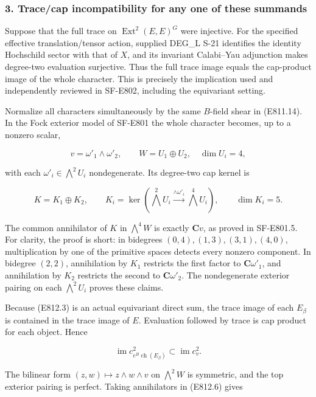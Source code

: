 \subsubsection{3. Trace/cap incompatibility for any one of these
summands}\label{tracecap-incompatibility-for-any-one-of-these-summands}

Suppose that the full trace on \(\operatorname{Ext}^2(E,E)^G\) were
injective. For the specified effective translation/tensor action,
supplied DEG\_L S-21 identifies the identity Hochschild sector with that
of \(X\), and its invariant Calabi--Yau adjunction makes degree-two
evaluation surjective. Thus the full trace image equals the cap-product
image of the whole character. This is precisely the implication used and
independently reviewed in SF-E802, including the equivariant setting.

Normalize all characters simultaneously by the same \(B\)-field shear in
(E811.14). In the Fock exterior model of SF-E801 the whole character
becomes, up to a nonzero scalar,

\[
 v=\omega'_1\wedge\omega'_2,
 \qquad W=U_1\oplus U_2,\quad\dim U_i=4,
\]

with each \(\omega'_i\in\bigwedge^2U_i\) nondegenerate. Its degree-two
cap kernel is

\[
 K=K_1\oplus K_2,
 \qquad K_i=\ker\left(\bigwedge^2U_i
                 \xrightarrow{\wedge\omega'_i}\bigwedge^4U_i\right),
 \qquad\dim K_i=5.
 \tag{E812.5}
\]

The common annihilator of \(K\) in \(\bigwedge^4W\) is exactly
\(\mathbf C v\), as proved in SF-E801.5. For clarity, the proof is
short: in bidegrees \((0,4),(1,3),(3,1),(4,0)\), multiplication by one
of the primitive spaces detects every nonzero component. In bidegree
\((2,2)\), annihilation by \(K_1\) restricts the first factor to
\(\mathbf C\omega'_1\), and annihilation by \(K_2\) restricts the second
to \(\mathbf C\omega'_2\). The nondegenerate exterior pairing on each
\(\bigwedge^2U_i\) proves these claims.

Because (E812.3) is an actual equivariant direct sum, the trace image of
each \(E_\beta\) is contained in the trace image of \(E\). Evaluation
followed by trace is cap product for each object. Hence

\[
 \operatorname{im}c^2_{e^B\operatorname{ch}(E_\beta)}
        \subset\operatorname{im}c^2_v.
 \tag{E812.6}
\]

The bilinear form \((z,w)\mapsto z\wedge w\wedge v\) on \(\bigwedge^2W\)
is symmetric, and the top exterior pairing is perfect. Taking
annihilators in (E812.6) gives

